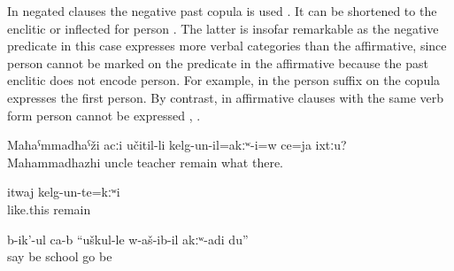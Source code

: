 In negated clauses the negative past copula  is used . It can be shortened to the enclitic   or inflected for person . The latter is insofar remarkable as the negative predicate in this case expresses more verbal categories than the affirmative, since person cannot be marked on the predicate in the affirmative because the past enclitic does not encode person. For example, in  the person suffix on the copula expresses the first person. By contrast, in affirmative clauses with the same verb form person cannot be expressed , .
%
\begin{exe}
	\ex	\label{ex:Mahammadhazhi was not working as a teacher or what there (in Sanzhi) analytic}
	\gll	Maħaˁmmadħaˁži	acːi	učitil-li	kelg-un-il=akːʷ-i=w	ce=ja	ixtːu?\\
		Mahammadhazhi	uncle	teacher	remain	what	there.\\
	\glt	{} 
	
	\ex	\label{ex:It was not like this analytic}
	\gll	itwaj	kelg-un-te=kːʷi\\
		like.this	remain\\
	\glt	{}

	\ex	\label{ex:‎‎(The wolf) said, I did not go to school analytic}
	\gll	b-ik'-ul	ca-b	``uškul-le	w-aš-ib-il		akːʷ-adi	du''\\
		say	be	school	go	be	\\
	\glt	{}

\end{exe}
